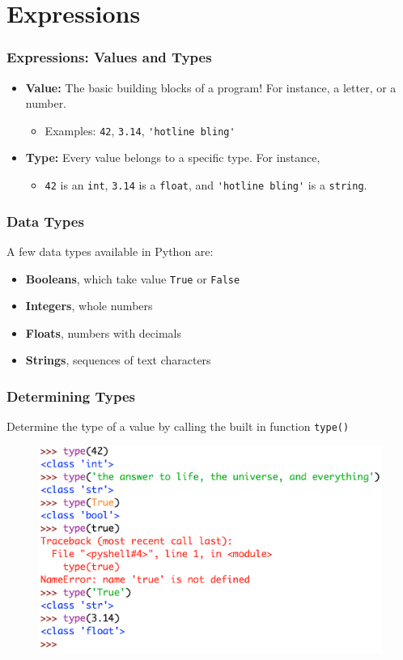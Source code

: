 \documentclass{beamer}
\newcommand{\<}{\langle}
\renewcommand{\>}{\rangle}
\begin{document}
\section{Expressions}

\begin{frame}[fragile]
\frametitle{Expressions: Values and Types}

\begin{itemize}
\item \textbf{Value:} The basic building blocks of a program! For instance, a letter, or a number.
	\begin{itemize}
	\item Examples: \verb|42|, \verb|3.14|, \verb|'hotline bling'|
	\end{itemize}
\item \textbf{Type:} Every value belongs to a specific type. For instance, 
	\begin{itemize}
	\item \verb|42| is an \verb|int|, \verb|3.14| is a \verb|float|, and \verb|'hotline bling'| is a \verb|string|.
	\end{itemize}
\end{itemize}
\end{frame}

\begin{frame}[fragile]
\frametitle{Data Types}

A few data types available in Python are:
\begin{itemize}
\item \textbf{Booleans}, which take value \verb|True| or \verb|False|
\item \textbf{Integers}, whole numbers
\item \textbf{Floats}, numbers with decimals
\item \textbf{Strings}, sequences of text characters
\end{itemize}
\end{frame}

\begin{frame}[fragile]
\frametitle{Determining Types}

Determine the type of a value by calling the built in function \verb|type()|

\begin{figure}
\centering
\includegraphics[scale=.3]{IMG/type.png}
\end{figure}
\end{frame}
\end{document}

